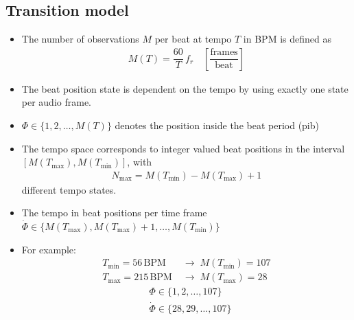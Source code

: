 \documentclass{article}
\begin{document}
\subsection{Transition model}
\begin{itemize}
\item The number of observations $M$ per beat at tempo $T$ in BPM is defined as 
\begin{align}
M(T) = \dfrac{60}{T} \,f_r \quad \left[ \dfrac{\text{frames}}{\text{beat}}\right]
\end{align} 
\item The beat position state is dependent on the tempo by using exactly one  state per audio frame.


\item $\Phi \in \{1,2,\dots, M(T)\}$ denotes the position inside the beat period (pib)
\item The tempo space corresponds to integer valued beat positions in the interval $[M(T_{\text{max}}), M(T_{\text{min}})]$, with 
\begin{align}
N_{\text{max}} = M(T_{\text{min}}) - M(T_{\text{max}}) + 1
\end{align} 
different tempo states.

\item The tempo in beat positions per time frame $\dot \Phi \in \{M(T_{\text{max}}), M(T_{\text{max}}) + 1,  \dots, M(T_{\text{min}})\}$ 
\item For example: 
\begin{align*}
T_{\text{min}} = 56 \,\text{BPM} & \;\rightarrow \; M(T_{\text{min}}) = 107 \\
T_{\text{max}} = 215 \,\text{BPM} &\;\rightarrow \; M(T_{\text{max}}) = 28 
\end{align*} 
\vspace{-1.5em}
\begin{align*}
&\Phi \in \{1, 2, \dots ,107\} \\
&\dot \Phi \in \{28, 29, \dots ,107\}
\end{align*} 



\end{itemize}
\end{document}
